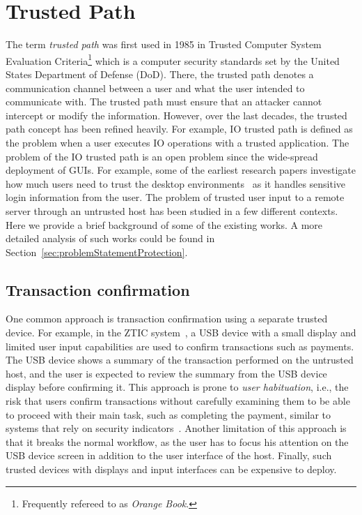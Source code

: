 \section{Trusted Path}
\label{ch:background:trustedPath}

The term \emph{trusted path} was first used in 1985 in Trusted Computer System Evaluation Criteria\footnote{Frequently refereed to as \emph{Orange Book}.}\cite{orange_book} which is a computer security standards set by the United States Department of Defense (DoD). There, the trusted path denotes a communication channel between a user and what the user intended to communicate with. The trusted path must ensure that an attacker cannot intercept or modify the information. However, over the last decades, the trusted path concept has been refined heavily. For example, IO trusted path is defined as the problem when a user executes IO operations with a trusted application. The problem of the IO trusted path is an open problem since the wide-spread deployment of GUIs. For example, some of the earliest research papers investigate how much users need to trust the desktop environments~\cite{epstein1991trusting} as it handles sensitive login information from the user.
The problem of trusted user input to a remote server through an untrusted host has been studied in a few different contexts. Here we provide a brief background of some of the existing works. A more detailed analysis of such works could be found in Section~\ref{sec:problemStatementProtection}.

\subsection{Transaction confirmation} One common approach is transaction confirmation using a separate trusted device. For example, in the ZTIC system~\cite{weigold2011}, a USB device with a small display and limited user input capabilities are used to confirm transactions such as payments. The USB device shows a summary of the transaction performed on the untrusted host, and the user is expected to review the summary from the USB device display before confirming it. This approach is prone to \emph{user habituation}, i.e., the risk that users confirm transactions without carefully examining them to be able to proceed with their main task, such as completing the payment, similar to systems that rely on security indicators~\cite{schechter2007emperor,197283,41927}. Another limitation of this approach is that it breaks the normal workflow, as the user has to focus his attention on the USB device screen in addition to the user interface of the host. Finally, such trusted devices with displays and input interfaces can be expensive to deploy. 

